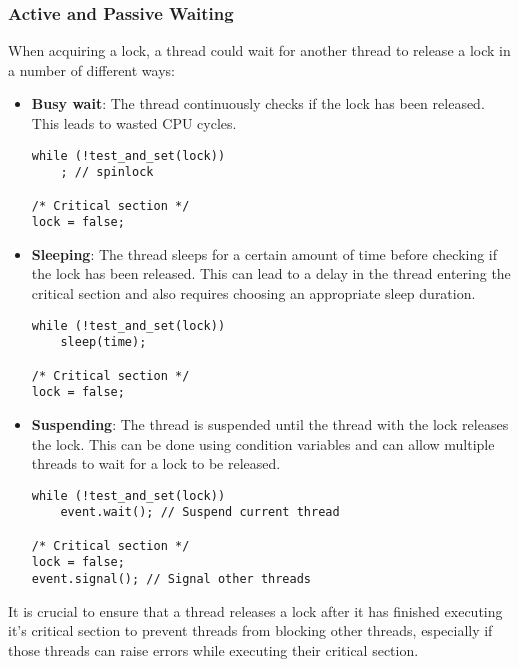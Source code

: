 \documentclass{article}
\begin{document}
\subsubsection{Active and Passive Waiting}
When acquiring a lock, a thread could wait for another thread to
release a lock in a number of different ways:
\begin{itemize}
    \item \textbf{Busy wait}: The thread continuously checks if the lock
          has been released. This leads to wasted CPU cycles.
          \begin{verbatim}
while (!test_and_set(lock))
    ; // spinlock

/* Critical section */
lock = false;
\end{verbatim}
    \item \textbf{Sleeping}: The thread sleeps for a certain amount of
          time before checking if the lock has been released. This can lead to
          a delay in the thread entering the critical section and also requires
          choosing an appropriate sleep duration.
          \begin{verbatim}
while (!test_and_set(lock))
    sleep(time);

/* Critical section */
lock = false;
\end{verbatim}
    \item \textbf{Suspending}: The thread is suspended until the thread
          with the lock releases the lock. This can be done using condition
          variables and can allow multiple threads to wait for a lock to be
          released.
          \begin{verbatim}
while (!test_and_set(lock))
    event.wait(); // Suspend current thread

/* Critical section */
lock = false;
event.signal(); // Signal other threads
\end{verbatim}
\end{itemize}
It is crucial to ensure that a thread releases a lock after it has
finished executing it's critical section to prevent threads from blocking
other threads, especially if those threads can raise errors while executing
their critical section.
\end{document}
